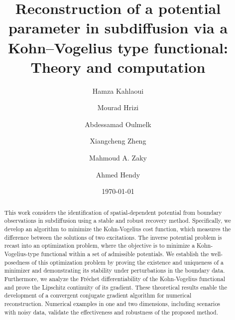 \documentclass[a4paper,12pt,reqno,natbib]{amsart}
\begin{document}
\title{Reconstruction of a potential parameter in subdiffusion via a Kohn--Vogelius type functional: Theory and computation}


\author{Hamza Kahlaoui}
\address[H. Kahlaoui]{Université de Tunis el Manar, école nationale d'ingénieurs de Tunis, 1002 Tunis, Tunisie}


\author{Mourad Hrizi}
\address[M. Hrizi]{ Monastir University, Department of Mathematics, Faculty of Sciences, Avenue de l'Environnement 5000, Monastir, Tunisia
}


\author{Abdessamad Oulmelk}
\address[A. Oulmelk]{Laboratory of Mathematics and Applications, FST Tanger, Abdelmalek Essaadi University, Morocco}



\author{Xiangcheng Zheng}
\address[Xiangcheng Zheng]{School of Mathematics, Shandong University, Jinan 250100, China}



\author{Mahmoud A. Zaky}
\address[M.
A. Zaky]{Department of Mathematics and Statistics, College of Science, Imam Mohammad Ibn Saud Islamic University (IMSIU), Riyadh, Saudi Arabia}





\author{Ahmed Hendy}
\address[A.S. Hendy]{Department of Computational Mathematics and Computer science, Institute of Natural Sciences and Mathematics, Ural Federal University, 19 Mira St., Yekaterinburg 620002, Russia\\
Department of Mathematics and Computer Science, faculty of science, Benha University, Benha 13511, Egypt}
\date{\today}

\begin{abstract}
This work considers the identification of spatial-dependent potential from boundary observations in subdiffusion using a stable and robust recovery method. Specifically, we develop an algorithm to minimize the Kohn-Vogelius cost function, which measures the difference between the solutions of two excitations. The inverse potential problem is recast into an optimization problem, where the objective is to minimize a Kohn-Vogelius-type functional within a set of admissible potentials. We establish the well-posedness of this optimization problem by proving the existence and uniqueness of a minimizer and demonstrating its stability under perturbations in the boundary data. Furthermore, we analyze the Fr\'echet differentiability of the Kohn-Vogelius functional and prove the Lipschitz continuity of its gradient. These theoretical results enable the development of a convergent conjugate gradient algorithm for numerical reconstruction. Numerical examples in one and two dimensions, including scenarios with noisy data, validate the effectiveness and robustness of the proposed method.
\end{abstract}
\end{document}
